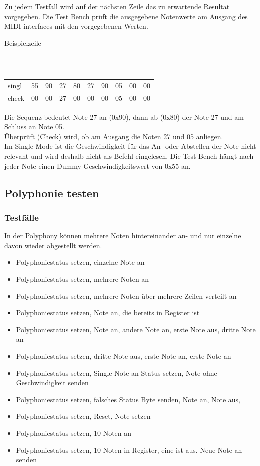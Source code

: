 Zu jedem Testfall wird auf der nächsten Zeile das zu erwartende Resultat vorgegeben. Die Test Bench prüft die ausgegebene Notenwerte am Ausgang des MIDI interfaces mit den vorgegebenen Werten.

Beispielzeile\\
\rule{\textwidth}{0.4pt}\\
{
\renewcommand{\arraystretch}{1.0} %
\begin{tabular*}{\textwidth}{@{}@{\extracolsep{\fill}}*{10}{l}@{}} %
singl & 55 & 90 & 27 & 80 & 27 & 90 & 05 & 00 & 00\\
check & 00 & 00 & 27 & 00 & 00 & 00 & 05 & 00 & 00\\
\end{tabular*}
}

Die Sequenz bedeutet Note 27 an (0x90), dann ab (0x80) der Note 27 und am Schluss an Note 05. \\
Überprüft (Check) wird, ob am Ausgang die Noten 27 und 05 anliegen.\\
Im Single Mode ist die Geschwindigkeit für das An- oder Abstellen der Note nicht relevant und wird deshalb nicht als Befehl eingelesen. Die Test Bench hängt nach jeder Note einen Dummy-Geschwindigkeitswert von 0x55 an.

\subsection{Polyphonie testen }\label{polyphonitest}

\subsubsection{Testfälle}

In der Polyphony können mehrere Noten hintereinander an- und nur einzelne davon wieder abgestellt werden.

\begin{itemize}
	\item Polyphoniestatus setzen, einzelne Note an
	\item Polyphoniestatus setzen, mehrere Noten an
	\item Polyphoniestatus setzen, mehrere Noten über mehrere Zeilen verteilt an
	\item Polyphoniestatus setzen, Note an, die bereits in Register ist
	\item Polyphoniestatus setzen, Note an, andere Note an, erste Note aus, dritte Note an
	\item Polyphoniestatus setzen, dritte Note aus, erste Note an, erste Note an
	\item Polyphoniestatus setzen, Single Note an Status setzen, Note ohne Geschwindigkeit senden
	\item Polyphoniestatus setzen, falsches Status Byte senden, Note an, Note aus,
	\item Polyphoniestatus setzen, Reset, Note setzen
	\item Polyphoniestatus setzen, 10 Noten an
	\item Polyphoniestatus setzen, 10 Noten in Register, eine ist aus. Neue Note an senden
\end{itemize}

